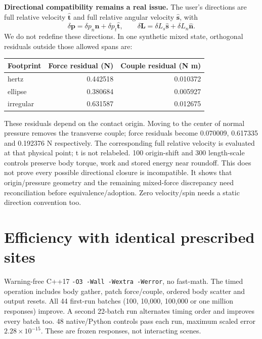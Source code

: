 \documentclass[10pt,a4paper]{article}
\newcommand{\toprule}{\hline}\newcommand{\midrule}{\hline}\newcommand{\bottomrule}{\hline}
\begin{document}
\textbf{Directional compatibility remains a real issue.}
The user's directions are full relative velocity $\hat{\mathbf t}$ and full
relative angular velocity $\hat{\mathbf s}$, with
\[
 \delta\mathbf p=\delta p_n\hat{\mathbf n}+\delta p_t\hat{\mathbf t},\qquad
 \delta\mathbf L=\delta L_s\hat{\mathbf s}+\delta L_n\hat{\mathbf n}.
\]
We do not redefine these directions. In one synthetic mixed state, orthogonal
residuals outside those allowed spans are:
\begin{center}\begin{tabular}{lrr}\toprule
Footprint & Force residual (N) & Couple residual (N m)\\\midrule
hertz & 0.442518 & 0.010372 \\
ellipse & 0.380684 & 0.005927 \\
irregular & 0.631587 & 0.012675 \\
\bottomrule\end{tabular}\end{center}
These residuals depend on the contact origin. Moving to the center of normal
pressure removes the transverse couple; force residuals become 0.070009, 0.617335
and 0.192376 N respectively. The corresponding full relative velocity is evaluated
at that physical point; t is not relabeled. 100 origin-shift and 300 length-scale
controls preserve body torque, work and stored energy near roundoff.
This does not prove every possible directional closure is incompatible. It shows
that origin/pressure geometry and the remaining mixed-force discrepancy need
reconciliation before equivalence/adoption. Zero velocity/spin needs a static
direction convention too.

\newpage
\section*{Efficiency with identical prescribed sites}
Warning-free C++17 \texttt{-O3 -Wall -Wextra -Werror}, no fast-math.
The timed operation includes body gather, patch force/couple, ordered body
scatter and output resets. All 44 first-run batches (100, 10,000, 100,000 or one
million responses) improve. A second 22-batch run alternates timing order and improves
every batch too. 48 native/Python controls pass each run, maximum scaled
error $2.28\times10^{-15}$. These are frozen responses, not interacting scenes.
\end{document}
